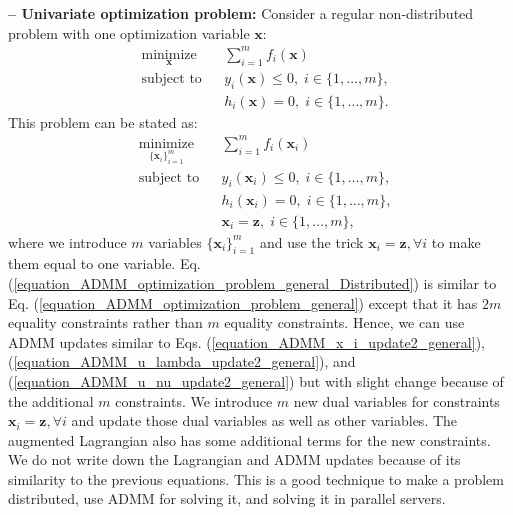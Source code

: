 \documentclass[lang=cn,10pt]{gorgeousnbook}
\numberwithin{equation}{section}%
\numberwithin{figure}{section}%
\begin{document}
\hfill\break
\textbf{-- Univariate optimization problem:}
Consider a regular non-distributed problem with one optimization variable $\boldsymbol{x}$:
\begin{equation}\label{equation_ADMM_optimization_problem_general_notDistributed}
\begin{aligned}
& \underset{\boldsymbol{x}}{\text{minimize}}
& & \sum_{i=1}^m f_i(\boldsymbol{x}) \\
& \text{subject to}
& & y_i(\boldsymbol{x}) \leq 0, \; i \in \{1, \ldots, m\}, \\
& & & h_i(\boldsymbol{x}) = 0, \; i \in \{1, \ldots, m\}.
\end{aligned}
\end{equation}
This problem can be stated as:
\begin{equation}\label{equation_ADMM_optimization_problem_general_Distributed}
\begin{aligned}
& \underset{\{\boldsymbol{x}_i\}_{i=1}^m}{\text{minimize}}
& & \sum_{i=1}^m f_i(\boldsymbol{x}_i) \\
& \text{subject to}
& & y_i(\boldsymbol{x}_i) \leq 0, \; i \in \{1, \ldots, m\}, \\
& & & h_i(\boldsymbol{x}_i) = 0, \; i \in \{1, \ldots, m\}, \\
& & & \boldsymbol{x}_i = \boldsymbol{z}, \; i \in \{1, \ldots, m\},
\end{aligned}
\end{equation}
where we introduce $m$ variables $\{\boldsymbol{x}_i\}_{i=1}^m$ and use the trick $\boldsymbol{x}_i = \boldsymbol{z}, \forall i$ to make them equal to one variable. 
Eq. (\ref{equation_ADMM_optimization_problem_general_Distributed}) is similar to Eq. (\ref{equation_ADMM_optimization_problem_general}) except that it has $2m$ equality constraints rather than $m$ equality constraints. Hence, we can use ADMM updates similar to Eqs. (\ref{equation_ADMM_x_i_update2_general}), (\ref{equation_ADMM_u_lambda_update2_general}), and (\ref{equation_ADMM_u_nu_update2_general}) but with slight change because of the additional $m$ constraints. We introduce $m$ new dual variables for constraints $\boldsymbol{x}_i = \boldsymbol{z}, \forall i$ and update those dual variables as well as other variables. The augmented Lagrangian also has some additional terms for the new constraints. 
We do not write down the Lagrangian and ADMM updates because of its similarity to the previous equations. This is a good technique to make a problem distributed, use ADMM for solving it, and solving it in parallel servers. 
\end{document}
